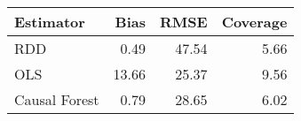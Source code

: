\begin{table}[ht]
\centering
\begin{tabular}{lrrr}
  \hline
Estimator & Bias & RMSE & Coverage \\ 
  \hline
RDD & 0.49 & 47.54 & 5.66 \\ 
  OLS & 13.66 & 25.37 & 9.56 \\ 
  Causal Forest & 0.79 & 28.65 & 6.02 \\ 
   \hline
\end{tabular}
\caption{} 
\end{table}
